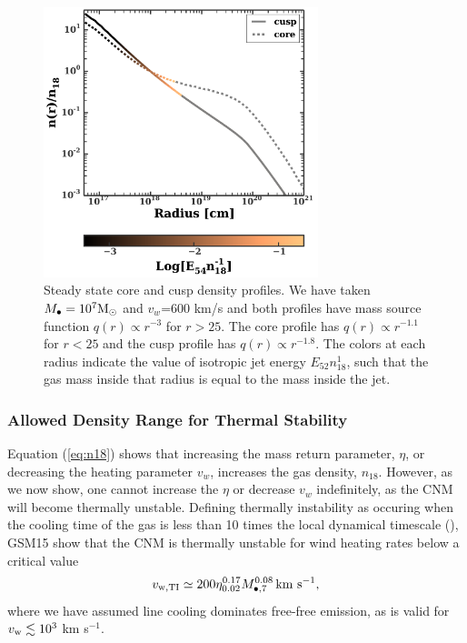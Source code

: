 \documentclass[usenatbib,fleqn]{mnras}
\newcommand{\Mbh}[1][]{M_{\bullet#1}}
\newcommand{\Msun}{{\rm M_\odot}}
\begin{document}
\begin{figure}
\includegraphics[width=8cm]{sedov_radius.pdf}
\caption{\label{fig:profiles} Steady state core and cusp density
  profiles. We have taken $\Mbh=10^{7} \Msun$ and $v_w$=600 km/s and
  both profiles have mass source function $q(r) \propto
  r^{-3}$ for $r > 25$. The core profile has $q(r) \propto
  r^{-1.1}$ for $r < 25$ and the cusp profile has $q(r)
  \propto r^{-1.8}$.  The colors at each radius indicate the value of
  isotropic jet energy $E_{52} n_{18}^{1}$, such that the gas mass
  inside that radius is equal to the mass inside the jet. }
\end{figure}




\subsubsection{Allowed Density Range for Thermal Stability}

Equation (\ref{eq:n18}) shows that increasing the mass return
parameter, $\eta$, or decreasing the heating parameter $v_w$,
increases the gas density, $n_{18}$.  However, as we now show, one
cannot increase the $\eta$ or decrease $v_w$ indefinitely, as the CNM
will become thermally unstable.  Defining thermally instability as
occuring when the cooling time of the gas is less than 10 times the
local dynamical timescale (\citealt{McCourt+2012}), GSM15 show that the
CNM is thermally unstable for wind heating rates below a critical
value
\begin{equation}
v_{\rm w,TI}\simeq 200 \eta_{0.02}^{0.17} \Mbh[,7]^{0.08} \,{\rm km \,\,s^{-1}},
\label{eq:ti}
\end{equation}
where we have assumed line cooling dominates free-free emission, as is valid for $v_{\rm w} \lesssim 10^{3}$ km s$^{-1}$.
\end{document}
